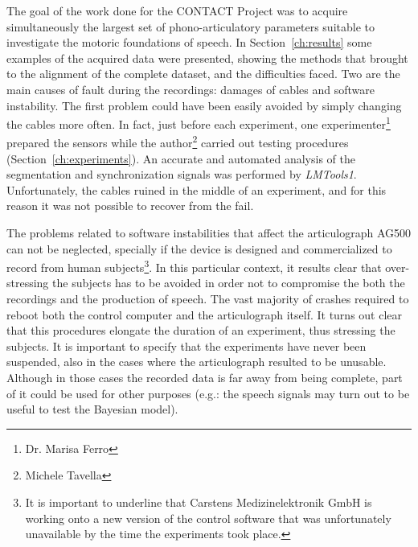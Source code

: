 The goal of the work done for the CONTACT Project was to acquire simultaneously
the largest set of phono-articulatory parameters suitable to investigate the
motoric foundations of speech.
In Section~\ref{ch:results} some examples of the 
acquired data were presented, showing
 the methods that brought to the alignment of the 
complete dataset, and the difficulties faced.
Two are the main causes of fault during the recordings: damages of cables and 
software instability.
The first problem could have been easily avoided by simply changing the cables
more often. 
In fact, just before each experiment, one experimenter\footnote{Dr. Marisa
Ferro} prepared the sensors while the author\footnote{Michele Tavella} 
carried out testing procedures
(Section~\ref{ch:experiments}).
An accurate and automated analysis of the segmentation and synchronization 
signals was performed by \emph{LMTools1}.
Unfortunately, the cables ruined in the middle of an experiment, and for this
reason it was not possible to recover from the fail.


The problems related to software instabilities that affect the articulograph 
AG500  can not be neglected, specially if the device is designed and 
commercialized to record from human subjects\footnote{It is important to
underline that Carstens Medizinelektronik GmbH is working onto a new version of
the control software that was unfortunately unavailable by the time the
experiments took place.}.
In this particular context, it results clear that over-stressing the subjects
has to be avoided in order not to compromise the both the recordings and the
production of speech.
The vast majority of crashes required to reboot both the control computer and
the articulograph itself. 
It turns out clear that this procedures elongate the duration of an experiment,
thus stressing the subjects.
It is important to specify that the experiments have never been suspended, also
in the cases where the articulograph resulted to be unusable.
Although in those cases the recorded data is far away from being complete, 
part of it could be used for other purposes (e.g.: the speech signals may turn
out to be useful to test the Bayesian model).

